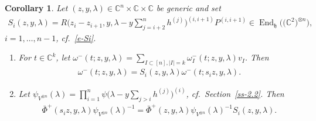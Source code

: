 \documentclass[10pt,a4paper]{amsart}
\numberwithin{equation}{section}
\newtheorem{Corollary}[Theorem]{Corollary}
\begin{document}
\begin{Corollary}\label{cor-1} Let $(z,y,\lambda)\in\mathbb C^n\times \mathbb C\times\mathbb C$ be generic and set
 \begin{gather*}
 S_i(z,y,\lambda)= R\bigg(z_i-z_{i+1},y,\lambda-y\sum_{j={i+2}}^{n}h^{(j)}\bigg)^{(i,i+1)}P^{(i,i+1)} \in\operatorname{End}_{\mathfrak h}\big(\big(\mathbb C^2\big)^{\otimes n}\big),
 \end{gather*}
 $i=1,\dots,n-1$, cf.~\eqref{e-Si}.
 \begin{enumerate}\itemsep=0pt
 \item[$(i)$] For $t\in\mathbb C^k$, let $\omega^-(t;z,y,\lambda)=\sum\limits_{I\subset[n], |I|=k}\omega^-_I(t;z,y,\lambda)v_I$. Then
 \begin{gather*}
 \omega^-(t;z,y,\lambda)=S_i(z,y,\lambda) \omega^-(t;s_iz,y,\lambda).
 \end{gather*}
 \item[$(ii)$] Let $\psi_{V^{\otimes n}}(\lambda)=\prod\limits_{i=1}^n\psi\big(\lambda-y \sum\limits_{j>i}h^{(j)}\big)^{(i)}$, cf.~Section~{\rm \ref{ss-2.2}}. Then
 \begin{gather*}
 \bar\Phi^+(s_iz,y,\lambda)\psi_{V^{\otimes n}}(\lambda)^{-1} =\bar\Phi^+(z,y,\lambda)\psi_{V^{\otimes n}}(\lambda)^{-1} S_i(z,y,\lambda).
 \end{gather*}
 \end{enumerate}
\end{Corollary}
\end{document}
